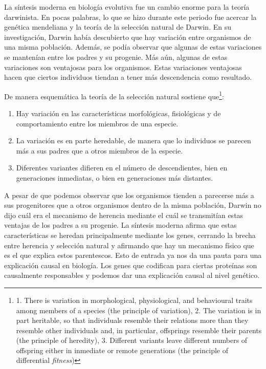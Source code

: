 \noindent La síntesis moderna en biología evolutiva fue un cambio enorme para la teoría darwinista. En pocas palabras, lo que se hizo durante este periodo fue acercar la genética mendeliana y la teoría de la selección natural de Darwin. En su investigación, Darwin había descubierto que hay variación entre organismos de una misma población. Además, se podía observar que algunas de estas variaciones se mantenían entre los padres y su progenie. Más aún, algunas de estas variaciones son ventajosas para los organismos. Estas variaciones ventajosas hacen que ciertos individuos tiendan a tener más descendencia como resultado.

De manera esquemática la teoría de la selección natural sostiene que\footnote{1. There is variation in morphological, physiological, and behavioural traits among members of a species (the principle of variation), 2. The variation is in part heritable, so that individuals resemble their relations more than they resemble other individuals and, in particular, offsprings resemble their parents (the principle of heredity), 3. Different variants leave different numbers of offspring either in inmediate or remote generations (the principle of differential \emph{fitness})}:

\begin{enumerate}
  \item Hay variación en las características morfológicas, fisiológicas y de comportamiento entre los miembros de una especie.
  \item La variación es en parte heredable, de manera que lo individuos se parecen más a sus padres que a otros miembros de la especie.
  \item Diferentes variantes difieren en el número de descendientes, bien en generaciones inmediatas, o bien en generaciones más distantes\cite{Godfrey-Smith2013}.
\end{enumerate}


A pesar de que podemos observar que los organismos tienden a parecerse más a sus progenitores que a otros organismos dentro de la
misma población, Darwin no dijo cuál era el mecanismo de herencia mediante el cuál se transmitían estas ventajas de los padres a
su progenie.
La síntesis moderna afirma que estas características se heredan principalmente mediante los genes, cerrando la brecha entre herencia y selección natural y afirmando que hay un mecanismo físico que es el que explica estos parentescos. Esto de entrada ya nos da una pauta para una explicación causal en biología. Los genes que codifican para ciertas proteínas son causalmente responsables y podemos dar una explicación causal al nivel genético.

